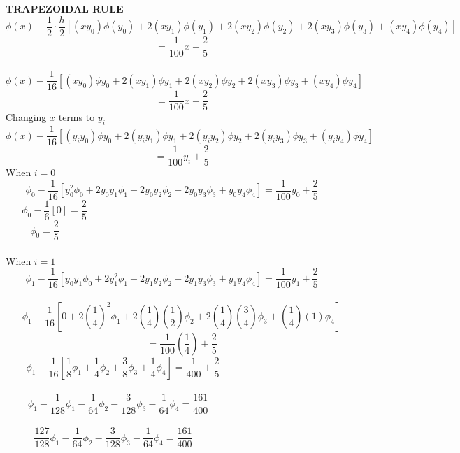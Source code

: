 \documentclass[a4paper,12pt]{report}
\newcommand{\bt}[1]{\textbf{#1}}
\newcommand{\spn}[1]{\\[#1cm]}
\newcommand{\NI}{\noindent}
\begin{document}
	\NI\bt{TRAPEZOIDAL RULE}
	$$
		\phi(x) - \frac{1}{2} \cdot \frac{h}{2} \left[(xy_0)\phi(y_0) + 2(xy_1)\phi(y_1) + 2(xy_2)\phi(y_2) + 2(xy_3)\phi(y_3)+(xy_4)\phi(y_4)\right] 
	$$
	$$
		= \frac{1}{100}x + \frac{2}{5}
	$$\spn{-0.8}
	$$
		\phi(x) - \frac{1}{16}\left[(xy_0)\phi y_0 + 2(xy_1)\phi y_1 + 2(xy_2)\phi y_2 + 2(xy_3)\phi y_3 + (xy_4)\phi y_4\right] \quad\quad\quad 
	$$
	\begin{equation}
		= \frac{1}{100}x + \frac{2}{5} \tag{4} \label{eq:g}
	\end{equation}
	Changing $x$ terms to $y_i$
	$$
	\phi(x) - \frac{1}{16}\left[(y_iy_0)\phi y_0 + 2(y_iy_1)\phi y_1 + 2(y_iy_2)\phi y_2 + 2(y_iy_3)\phi y_3 + (y_iy_4)\phi y_4\right] \quad\quad\quad 
	$$
	$$
		= \frac{1}{100}y_i + \frac{2}{5}
	$$
	When $i=0$
	$$
		\phi_0 - \frac{1}{16}\left[y_0^2\phi_0 + 2y_0y_1\phi_1 + 2y_0y_2\phi_2 + 2y_0y_3\phi_3 + y_0y_4\phi_4\right] = \frac{1}{100}y_0 + \frac{2}{5} \quad\quad
	$$
	$$
		\phi_0 - \frac{1}{6}\left[0\right] = \frac{2}{5} \quad\quad\quad\quad\quad\quad\quad\quad\quad\quad\quad\quad\quad\quad\quad\quad\quad\quad\quad\quad\quad\quad\quad\quad\quad\quad
	$$
	\begin{equation}
		\phi_0  = \frac{2}{5} \tag{i} \quad\quad\quad\quad\quad\quad\quad\quad\quad\quad\quad\quad\quad\quad\quad\quad\quad\quad\quad\quad\quad\quad\quad\quad\quad\quad\quad\quad
	\end{equation}
	\spn{-0.2}When $i=1$
	$$
		\phi_1 - \frac{1}{16}\left[y_0y_1\phi_0 + 2y_1^2\phi_1 + 2y_1y_2\phi_2 + 2y_1y_3\phi_3 + y_1y_4\phi_4\right] = \frac{1}{100}y_1 + \frac{2}{5} \quad\quad
	$$\spn{-0.5}
	$$
		\phi_1 - \frac{1}{16}\left[0 + 2\left(\frac{1}{4}\right)^2\phi_1 + 2\left(\frac{1}{4}\right)\left(\frac{1}{2}\right)\phi_2 +2\left(\frac{1}{4}\right)\left(\frac{3}{4}\right)\phi_3 + \left(\frac{1}{4}\right)\left(1\right)\phi_4\right]
	$$
	$$
		= \frac{1}{100}\left(\frac{1}{4}\right)+\frac{2}{5}
	$$
	$$
		\phi_1 - \frac{1}{16}\left[\frac{1}{8}\phi_1 +\frac{1}{4}\phi_2 +\frac{3}{8}\phi_3 +\frac{1}{4}\phi_4\right] = \frac{1}{400}+\frac{2}{5}\quad\quad\quad\quad\quad\quad\quad\quad\quad\quad\quad\quad
	$$\spn{-0.9}
	$$
		\phi_1 - \frac{1}{128}\phi_1 -\frac{1}{64}\phi_2 -\frac{3}{128}\phi_3 -\frac{1}{64}\phi_4 = \frac{161}{400}\quad\quad\quad\quad\quad\quad\quad\quad\quad\quad\quad\qquad
	$$\spn{-0.9}
	\begin{equation}
		\frac{127}{128}\phi_1 -\frac{1}{64}\phi_2 -\frac{3}{128}\phi_3 -\frac{1}{64}\phi_4 = \frac{161}{400} \tag{ii} \quad\quad\quad\quad\quad\quad\quad\quad\quad\quad\quad\quad\quad\quad
	\end{equation}
\end{document}

